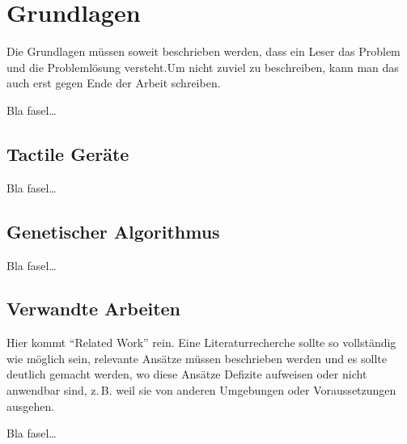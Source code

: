 
\chapter{Grundlagen}
\label{ch:Grundlagen}
Die Grundlagen müssen soweit beschrieben
werden, dass ein Leser das Problem und
die Problemlösung  versteht.Um nicht zuviel 
zu beschreiben, kann man das auch erst gegen 
Ende der Arbeit schreiben.

Bla fasel\ldots

\section{Tactile Geräte}
\label{ch:Grundlagen:sec:Taktile Geräte}

Bla fasel\ldots




\section{Genetischer Algorithmus}
\label{ch:Grundlagen:sec:Genetischer Algorithmus}

Bla fasel\ldots


\section{Verwandte Arbeiten}
\label{ch:Grundlagen:sec:RelatedWork}
Hier kommt "`Related Work"' rein.
Eine Literaturrecherche sollte so vollständig wie möglich sein,
relevante Ansätze müssen beschrieben werden und es sollte deutlich 
gemacht werden, wo diese Ansätze Defizite aufweisen oder nicht
anwendbar sind, z.\,B. weil sie von anderen Umgebungen oder 
Voraussetzungen ausgehen.


Bla fasel\ldots

